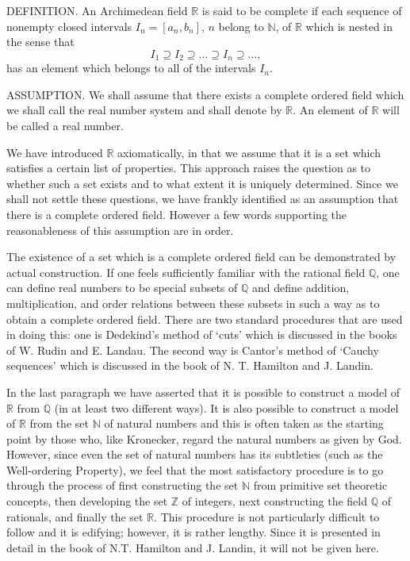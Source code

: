 \documentclass[a4paper]{article}
\begin{document}
DEFINITION. An Archimedean field $\mathbb{R}$ is said to be complete if each sequence of nonempty closed intervals $I_n = [a_n, b_n]$,
$n$ belong to $\mathbb{N}$, of $\mathbb{R}$ which is nested in the sense that
$$I_1 \supseteq I_2 \supseteq \ldots \supseteq I_n \supseteq \ldots,$$
has an element which belongs to all of the intervals $I_n$.

ASSUMPTION. We shall assume that there exists a complete ordered field which we shall call the real number system and shall
denote by $\mathbb{R}$. An element of $\mathbb{R}$ will be called a real number.

We have introduced $\mathbb{R}$ axiomatically, in that we assume that it is a set which satisfies a certain list of properties.
This approach raises the question as to whether such a set exists and to what extent it is uniquely determined. Since we shall
not settle these questions, we have frankly identified as an assumption that there is a complete ordered field. However a few
words supporting the reasonableness of this assumption are in order.

The existence of a set which is a complete ordered field can be demonstrated by actual construction. If one feels sufficiently
familiar with the rational field $\mathbb{Q}$, one can define real numbers to be special subsets of $\mathbb{Q}$ and define
addition, multiplication, and order relations between these subsets in such a way as to obtain a complete ordered field.
There are two standard procedures that are used in doing this: one is Dedekind's method of `cuts' which is discussed in the
books of W. Rudin and E. Landau. The second way is Cantor's method of `Cauchy sequences' which is discussed in the book of
N. T. Hamilton and J. Landin.

In the last paragraph we have asserted that it is possible to construct a model of $\mathbb{R}$ from $\mathbb{Q}$ (in at least
two different ways). It is also possible to construct a model of $\mathbb{R}$ from the set $\mathbb{N}$ of natural numbers and
this is often taken as the starting point by those who, like Kronecker, regard the natural numbers as given by God. However,
since even the set of natural numbers has its subtleties (such as the Well-ordering Property), we feel that the most
satisfactory procedure is to go through the process of first constructing the set $\mathbb{N}$ from primitive set theoretic
concepts, then developing the set $\mathbb{Z}$ of integers, next constructing the field $\mathbb{Q}$ of rationals, and finally
the set $\mathbb{R}$. This procedure is not particularly difficult to follow and it is edifying; however, it is rather lengthy.
Since it is presented in detail in the book of N.T. Hamilton and J. Landin, it will not be given here.
\end{document}
